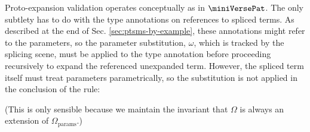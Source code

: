 \documentclass[acmsmall,10pt,review,anonymous]{acmart}\settopmatter{printfolios=true}
\begin{document}
Proto-expansion validation operates conceptually as in $\miniVersePat$. The only subtlety has to do with the type annotations on references to spliced terms. As described at the end of Sec. \ref{sec:ptsms-by-example}, these annotations might refer to the parameters, so the parameter substitution, $\omega$, which is tracked by the splicing scene, must be applied to the type annotation before proceeding recursively to expand the referenced unexpanded term. However, the spliced term itself must treat parameters parametrically, so the substitution is not applied in the conclusion of the rule:
\begin{mathpar}\label{rule:cvalidE-P-splicede}
\vspace{-5px}
\end{mathpar}
(This is only sensible because we maintain the invariant that $\Omega$ is always an extension of $\Omega_\text{params}$.)
\end{document}
